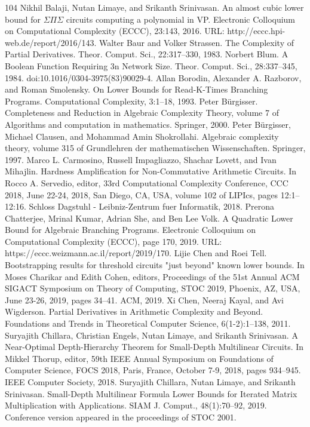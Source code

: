 \documentclass[10pt,a4paper]{article}
\begin{document}
\begin{thebibliography}{104}
 Nikhil Balaji, Nutan Limaye, and Srikanth Srinivasan. An almost cubic lower bound for $\Sigma\Pi\Sigma$ circuits computing a polynomial in VP. Electronic Colloquium on Computational Complexity (ECCC), 23:143, 2016. URL: http://eccc.hpi-web.de/report/2016/143.
 Walter Baur and Volker Strassen. The Complexity of Partial Derivatives. Theor. Comput. Sci., 22:317–330, 1983.
 Norbert Blum. A Boolean Function Requiring 3n Network Size. Theor. Comput. Sci., 28:337–345, 1984. doi:10.1016/0304-3975(83)90029-4.
 Allan Borodin, Alexander A. Razborov, and Roman Smolensky. On Lower Bounds for Read-K-Times Branching Programs. Computational Complexity, 3:1–18, 1993.
 Peter Bürgisser. Completeness and Reduction in Algebraic Complexity Theory, volume 7 of Algorithms and computation in mathematics. Springer, 2000.
 Peter Bürgisser, Michael Clausen, and Mohammad Amin Shokrollahi. Algebraic complexity theory, volume 315 of Grundlehren der mathematischen Wissenschaften. Springer, 1997.
 Marco L. Carmosino, Russell Impagliazzo, Shachar Lovett, and Ivan Mihajlin. Hardness Amplification for Non-Commutative Arithmetic Circuits. In Rocco A. Servedio, editor, 33rd Computational Complexity Conference, CCC 2018, June 22-24, 2018, San Diego, CA, USA, volume 102 of LIPIcs, pages 12:1–12:16. Schloss Dagstuhl - Leibniz-Zentrum fuer Informatik, 2018.
 Prerona Chatterjee, Mrinal Kumar, Adrian She, and Ben Lee Volk. A Quadratic Lower Bound for Algebraic Branching Programs. Electronic Colloquium on Computational Complexity (ECCC), page 170, 2019. URL: https://eccc.weizmann.ac.il/report/2019/170.
 Lijie Chen and Roei Tell. Bootstrapping results for threshold circuits "just beyond" known lower bounds. In Moses Charikar and Edith Cohen, editors, Proceedings of the 51st Annual ACM SIGACT Symposium on Theory of Computing, STOC 2019, Phoenix, AZ, USA, June 23-26, 2019, pages 34–41. ACM, 2019.
 Xi Chen, Neeraj Kayal, and Avi Wigderson. Partial Derivatives in Arithmetic Complexity and Beyond. Foundations and Trends in Theoretical Computer Science, 6(1-2):1–138, 2011.
 Suryajith Chillara, Christian Engels, Nutan Limaye, and Srikanth Srinivasan. A Near-Optimal Depth-Hierarchy Theorem for Small-Depth Multilinear Circuits. In Mikkel Thorup, editor, 59th IEEE Annual Symposium on Foundations of Computer Science, FOCS 2018, Paris, France, October 7-9, 2018, pages 934–945. IEEE Computer Society, 2018.
 Suryajith Chillara, Nutan Limaye, and Srikanth Srinivasan. Small-Depth Multilinear Formula Lower Bounds for Iterated Matrix Multiplication with Applications. SIAM J. Comput., 48(1):70–92, 2019. Conference version appeared in the proceedings of STOC 2001.

\end{thebibliography}
\end{document}
